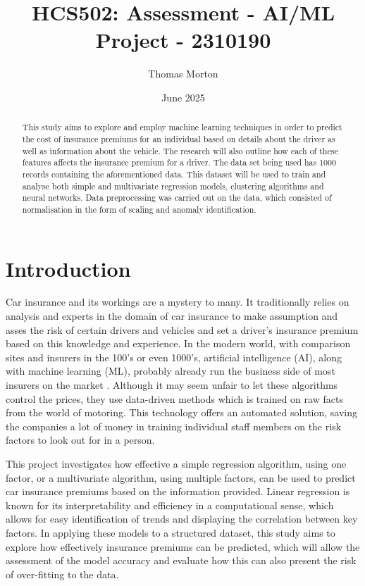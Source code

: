 \documentclass{article}
\title{HCS502: Assessment - AI/ML Project - 2310190}
\author{Thomas Morton}
\date{June 2025}
\begin{document}
\maketitle

\begin{abstract}
This study aims to explore and employ machine learning techniques in order to predict the cost of insurance premiums for an individual based on details about the driver as well as information about the vehicle. The research will also outline how each of these features affects the insurance premium for a driver. The data set being used has 1000 records containing the aforementioned data. This dataset will be used to train and analyse both simple and multivariate regression models, clustering algorithms and neural networks. Data preprocessing was carried out on the data, which consisted of normalisation in the form of scaling and anomaly identification.

\end{abstract}

\newpage

\section{Introduction}
Car insurance and its workings are a mystery to many. It traditionally relies on analysis and experts in the domain of car insurance to make assumption and asses the risk of certain drivers and vehicles and set a driver's insurance premium based on this knowledge and experience. In the modern world, with comparison sites and insurers in the 100's or even 1000's, artificial intelligence (AI), along with machine learning (ML), probably already run the business side of most insurers on the market \cite{WANG2020582}. Although it may seem unfair to let these algorithms control the prices, they use data-driven methods which is trained on raw facts from the world of motoring. This technology offers an automated solution, saving the companies a lot of money in training individual staff members on the risk factors to look out for in a person. 

This project investigates how effective a simple regression algorithm, using one factor, or a multivariate algorithm, using multiple factors, can be used to predict car insurance premiums based on the information provided. Linear regression is known for its interpretability and efficiency in a computational sense\cite{scikit_LR}, which allows for easy identification of trends and displaying the correlation between key factors. In applying these models to a structured dataset, this study aims to explore how effectively insurance premiums can be predicted, which will allow the assessment of the model accuracy and evaluate how this can also present the risk of over-fitting to the data.
\end{document}

